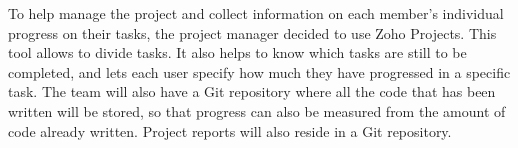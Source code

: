 
To help manage the project and collect information on each member's individual progress on their tasks, the project manager decided to use Zoho Projects. This tool allows to divide tasks.  It also helps to know which tasks are still to be completed, and lets each user specify how much they have progressed in a specific task. The team will also have a Git repository where all the code that has been written will be stored, so that progress can also be measured from the amount of code already written. Project reports will also reside in a Git repository.
